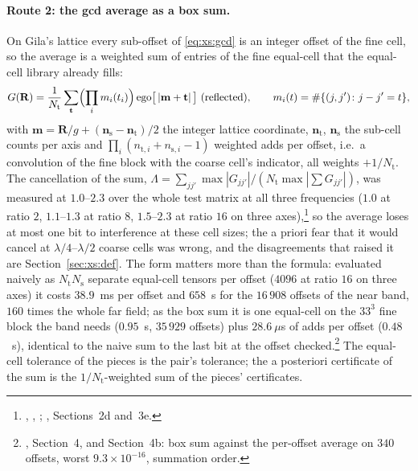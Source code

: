 \paragraph{Route 2: the gcd average as a box sum.} On Gila's lattice every sub-offset of
\eqref{eq:xs:gcd} is an integer offset of the fine cell, so the average is a weighted sum of
entries of the fine equal-cell  that the equal-cell library already fills:
\begin{equation}
G(\mathbf{R}) = \frac{1}{N_{\mathrm{t}}}\sum_{\mathbf{t}}\Bigl(\prod_i m_i(t_i)\Bigr)\,
\mathrm{ego}\bigl[\,|\mathbf{m}+\mathbf{t}|\,\bigr]\ \text{(reflected)},\qquad
m_i(t) = \#\{(j,j')\colon j-j' = t\},
\label{eq:xs:box}
\end{equation}
with $\mathbf{m} = \mathbf{R}/g + (\mathbf{n}_{\mathrm{s}}-\mathbf{n}_{\mathrm{t}})/2$ the
integer lattice coordinate, $\mathbf{n}_{\mathrm{t}}$, $\mathbf{n}_{\mathrm{s}}$ the
sub-cell counts per axis and
$\prod_i(n_{\mathrm{t},i}+n_{\mathrm{s},i}-1)$ weighted adds per offset, i.e.\ a
convolution of the fine block with the coarse cell's indicator, all weights $+1/N_{\mathrm{t}}$.
The cancellation of the sum, $\Lambda = \sum_{jj'}\max|G_{jj'}|/(N_{\mathrm{t}}\max|\sum G_{jj'}|)$,
was measured at $1.0$--$2.3$ over the whole test matrix at all three frequencies
($1.0$ at ratio $2$, $1.1$--$1.3$ at ratio $8$, $1.5$--$2.3$ at ratio $16$ on three
axes),\footnote{, ,
; , Sections~2d and~3e.} so the average loses at most
one bit to interference at these cell sizes; the a priori fear that it would cancel at
$\lambda/4$--$\lambda/2$ coarse cells was wrong, and the disagreements that raised it are
Section~\ref{sec:xs:def}. The form matters more than the formula: evaluated naively as
$N_{\mathrm{t}}N_{\mathrm{s}}$ separate equal-cell tensors per offset ($4096$ at ratio $16$
on three axes) it costs $38.9$~ms per offset and $658$~s for the $16\,908$ offsets of the
near band, $160$ times the whole far field; as the box sum it is one equal-cell
 on the $33^3$ fine block the band needs ($0.95$~s, $35\,929$ offsets) plus
$28.6~\mu$s of adds per offset ($0.48$~s), identical to the naive sum to the last bit at the
offset checked.\footnote{, Section~4, and Section~4b:
box sum against the per-offset average on $340$ offsets, worst $9.3\times10^{-16}$,
summation order.} The equal-cell tolerance of the pieces is the pair's tolerance; the a
posteriori certificate of the sum is the $1/N_{\mathrm{t}}$-weighted sum of the pieces'
certificates.

